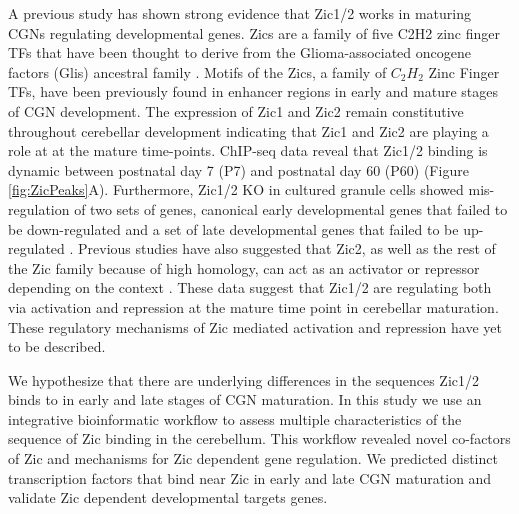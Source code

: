 \documentclass[fleqn,10pt]{wlscirep}
\begin{document}
A previous study has shown strong evidence that Zic1/2 works in maturing CGNs regulating developmental genes. Zics are a family of five C2H2 zinc finger TFs that have been thought to derive from the Glioma-associated oncogene factors (Glis) ancestral family \cite{Tohmonda2018IdentificationProteins, Ishiguro2018LinkExpression}. Motifs of the Zics, a family of $C_2H_2$ Zinc Finger TFs, have been previously found in enhancer regions in early and mature stages of CGN development. The expression of Zic1 and Zic2 remain constitutive throughout cerebellar development indicating that Zic1 and Zic2 are playing a role at at the mature time-points. ChIP-seq data reveal that Zic1/2 binding is dynamic between postnatal day 7 (P7) and postnatal day 60 (P60) (Figure \ref{fig:ZicPeaks}A). Furthermore, Zic1/2 KO in cultured granule cells showed mis-regulation of two sets of genes, canonical early developmental genes that failed to be down-regulated and a set of late developmental genes that failed to be up-regulated \cite{Frank2015RegulationCerebellum}. Previous studies have also suggested that Zic2, as well as the rest of the Zic family because of high homology, can act as an activator or repressor depending on the context \cite{Ishiguro2018LinkExpression, Himeda2013Pax3Enhancer, Luo2015Zic2Specification, Hatayama2018RoleRemodeling.}. These data suggest that Zic1/2 are regulating both via activation and repression at the mature time point in cerebellar maturation. These regulatory mechanisms of Zic mediated activation and repression have yet to be described.
 
We hypothesize that there are underlying differences in the sequences Zic1/2 binds to in early and late stages of CGN maturation. In this study we use an integrative bioinformatic workflow to assess multiple characteristics of the sequence of Zic binding in the cerebellum.  This workflow revealed novel co-factors of Zic and mechanisms for Zic dependent gene regulation. We predicted distinct transcription factors that bind near Zic in early and late CGN maturation and validate Zic dependent developmental targets genes.
\end{document}
